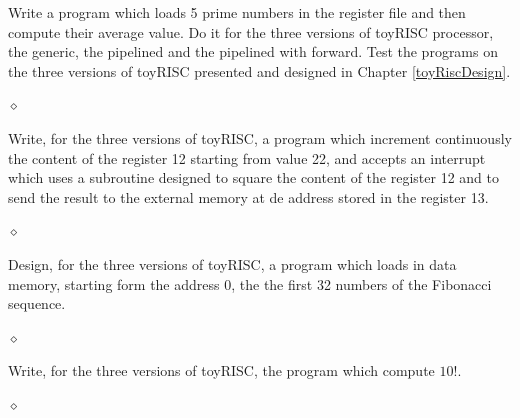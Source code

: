 \begin{problem}
Write a program which loads 5  prime numbers in the register file and then compute their average value. Do it for the three versions of toyRISC processor, the generic, the pipelined and the pipelined with forward. Test the programs on the three  versions of toyRISC presented and designed in Chapter \ref{toyRiscDesign}.

$\diamond$
\end{problem}

\begin{problem}
Write, for the three versions of toyRISC, a program which increment continuously the content of the register 12 starting from value 22, and accepts an interrupt which uses a subroutine designed to  square the content of the register 12 and to send the result to the external memory at de address stored in the register 13.

$\diamond$
\end{problem}


\begin{problem}
Design, for the three versions of toyRISC,  a program which loads in data memory, starting form the address 0, the the first 32 numbers of the Fibonacci sequence.

$\diamond$
\end{problem}

\begin{problem}
Write, for the three versions of toyRISC,  the program which compute $10!$.

$\diamond$
\end{problem}

